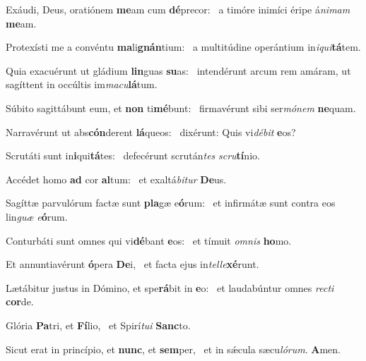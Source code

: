 \item Exáudi, Deus, oratiónem \textbf{me}am cum \textbf{dé}precor:~\psstar{} a timóre inimíci éripe á\textit{nimam} \textbf{me}am.
\item Protexísti me a convéntu \textbf{ma}li\textbf{gnán}tium:~\psstar{} a multitúdine operántium in\textit{iqui}\textbf{tá}tem.
\item Quia exacuérunt ut gládium \textbf{lin}guas \textbf{su}as:~\psstar{} intendérunt arcum rem amáram, ut sagíttent in occúltis im\textit{macu}\textbf{lá}tum.
\item Súbito sagittábunt eum, et \textbf{non} ti\textbf{mé}bunt:~\psstar{} firmavérunt sibi ser\textit{mónem} \textbf{ne}quam.
\item Narravérunt ut abs\textbf{cón}derent \textbf{lá}queos:~\psstar{} dixérunt: Quis vi\textit{débit} \textbf{e}os?
\item Scrutáti sunt in\textbf{i}qui\textbf{tá}tes:~\psstar{} defecérunt scrután\textit{tes} \textit{scru}\textbf{tí}nio.
\item Accédet homo \textbf{ad} cor \textbf{al}tum:~\psstar{} et exaltá\textit{bitur} \textbf{De}us.
\item Sagíttæ parvulórum factæ sunt \textbf{pla}gæ e\textbf{ó}rum:~\psstar{} et infirmátæ sunt contra eos lin\textit{guæ} \textit{e}\textbf{ó}rum.
\item Conturbáti sunt omnes qui vi\textbf{dé}bant \textbf{e}os:~\psstar{} et tímuit \textit{omnis} \textbf{ho}mo.
\item Et annuntiavérunt \textbf{ó}pera \textbf{De}i,~\psstar{} et facta ejus in\textit{telle}\textbf{xé}runt.
\item Lætábitur justus in Dómino, et spe\textbf{rá}bit in \textbf{e}o:~\psstar{} et laudabúntur omnes \textit{recti} \textbf{cor}de.
\item Glória \textbf{Pa}tri, et \textbf{Fí}lio,~\psstar{} et Spirí\textit{tui} \textbf{Sanc}to.
\item Sicut erat in princípio, et \textbf{nunc}, et \textbf{sem}per,~\psstar{} et in sǽcula sæcu\textit{lórum}. \textbf{A}men.
